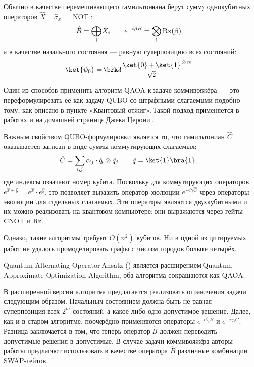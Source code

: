 Обычно в качестве перемешивающего гамильтониана берут сумму однокубитных операторов $\hat X = \hat \sigma_x = \operatorname{NOT}$:
$$
\hat B = \bigoplus_i \hat X_i
\qquad
e^{- i \beta \hat B} = \bigotimes_i \operatorname{Rx}(\beta)
$$
а в качестве начального состояния --- равную суперпозицию всех состояний:
$$
\ket{\psi_0} = 
\brk3{
    \frac{\ket{0} + \ket{1}}{\sqrt 2}
}^{\otimes\, m}
$$


Один из способов применить алгоритм QAOA к задаче коммивояжёра~--- это переформулировать её как задачу QUBO со штрафными слагаемыми подобно тому, как описано в пункте «Квантовый отжиг». Такой подход применяется в работах \cite{Stanford1, stanford2} и на домашней странице Джека Церони \cite{HomePage}.

Важным свойством QUBO-формулировки является то, что гамильтониан $\hat C$ оказывается записан в виде суммы коммутирующих слагаемых:
$$
\hat C = \sum_{i,j} c_{ij} \cdot \hat q_i \otimes \hat q_j
\qquad
\hat q = \ket{1}\bra{1},
$$
где индексы означают номер кубита. 
Поскольку для коммутирующих операторов $e^{\hat x + \hat y} = e^{\hat x} \cdot e^{\hat y}$, это позволяет выразить оператор эволюции $e^{-i \gamma \hat C}$ через операторы эволюции для отдельных слагаемых. Эти операторы являются двухкубитными и их можно реализовать на квантовом компьютере; они выражаются через гейты CNOT и Rz.

Однако, такие алгоритмы требуют $O(n^2)$ кубитов. Ни в одной из цитируемых работ не удалось промоделировать графы с числом городов больше четырёх. 


Quantum Alternating Operator Ansatz \cite{Alternating} (\citeyear{Alternating}) является расширением Quantum Approximate Optimization Algorithm, оба алгоритма сокращаются как QAOA.

В расширенной версии алгоритма предлагается реализовать ограничения задачи следующим образом. Начальным состоянием должна быть не равная суперпозиция всех $2^m$ состояний, а какое-либо одно допустимое решение. Далее, как и в старом алгоритме, поочерёдно применяются операторы $e^{-i \beta_i \hat B}$ и $e^{-i \gamma_i \hat C}$. Разница заключается в том, что теперь оператор $\hat B$ должен переводить допустимые решения в допустимые. В случае задачи коммивояжёра авторы работы \cite{Alternating} предлагают использовать в качестве оператора $\hat B$ различные комбинации SWAP-гейтов. 

